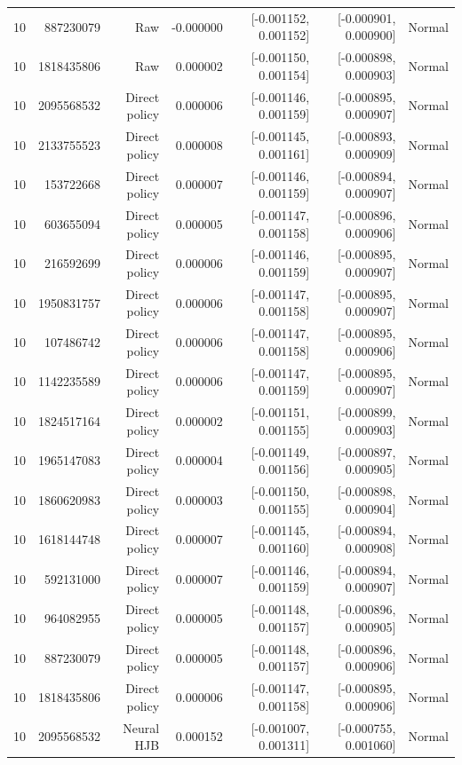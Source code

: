 \begin{longtable}{lrrrrrr}
10 & 887230079 & Raw & -0.000000 & [-0.001152, 0.001152] & [-0.000901, 0.000900] & Normal \\
10 & 1818435806 & Raw & 0.000002 & [-0.001150, 0.001154] & [-0.000898, 0.000903] & Normal \\
10 & 2095568532 & Direct policy & 0.000006 & [-0.001146, 0.001159] & [-0.000895, 0.000907] & Normal \\
10 & 2133755523 & Direct policy & 0.000008 & [-0.001145, 0.001161] & [-0.000893, 0.000909] & Normal \\
10 & 153722668 & Direct policy & 0.000007 & [-0.001146, 0.001159] & [-0.000894, 0.000907] & Normal \\
10 & 603655094 & Direct policy & 0.000005 & [-0.001147, 0.001158] & [-0.000896, 0.000906] & Normal \\
10 & 216592699 & Direct policy & 0.000006 & [-0.001146, 0.001159] & [-0.000895, 0.000907] & Normal \\
10 & 1950831757 & Direct policy & 0.000006 & [-0.001147, 0.001158] & [-0.000895, 0.000907] & Normal \\
10 & 107486742 & Direct policy & 0.000006 & [-0.001147, 0.001158] & [-0.000895, 0.000906] & Normal \\
10 & 1142235589 & Direct policy & 0.000006 & [-0.001147, 0.001159] & [-0.000895, 0.000907] & Normal \\
10 & 1824517164 & Direct policy & 0.000002 & [-0.001151, 0.001155] & [-0.000899, 0.000903] & Normal \\
10 & 1965147083 & Direct policy & 0.000004 & [-0.001149, 0.001156] & [-0.000897, 0.000905] & Normal \\
10 & 1860620983 & Direct policy & 0.000003 & [-0.001150, 0.001155] & [-0.000898, 0.000904] & Normal \\
10 & 1618144748 & Direct policy & 0.000007 & [-0.001145, 0.001160] & [-0.000894, 0.000908] & Normal \\
10 & 592131000 & Direct policy & 0.000007 & [-0.001146, 0.001159] & [-0.000894, 0.000907] & Normal \\
10 & 964082955 & Direct policy & 0.000005 & [-0.001148, 0.001157] & [-0.000896, 0.000905] & Normal \\
10 & 887230079 & Direct policy & 0.000005 & [-0.001148, 0.001157] & [-0.000896, 0.000906] & Normal \\
10 & 1818435806 & Direct policy & 0.000006 & [-0.001147, 0.001158] & [-0.000895, 0.000906] & Normal \\
10 & 2095568532 & Neural HJB & 0.000152 & [-0.001007, 0.001311] & [-0.000755, 0.001060] & Normal \\

\end{longtable}
